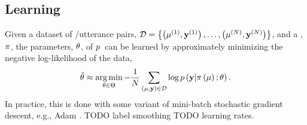 




\subsection{Learning}

Given a dataset of \meaningrepresentation/utterance pairs, $\mathcal{D} = \left\{\left(\mu^{(1)}, \mathbf{y}^{(1)}\right), \ldots, \left(\mu^{(N)},\mathbf{y}^{(N)} \right)\right\}$, 
and a 
\linearizationstrategy, $\pi$, the parameters, $\theta$, of $p$~can be learned by approximately
minimizing the negative log-likelihood of the data,
\[ \hat{\theta} \approx \operatorname*{arg\,min}_{\theta \in \Theta} -\frac{1}{N}\sum_{\left(\mu, \mathbf{y} \right) \in \mathcal{D}} 
    \log p\left(\mathbf{y}|\pi\left(\mu\right);\theta\right).
\]
In practice, this is done with some variant of mini-batch stochastic gradient descent, e.g., Adam
\cite{adam}.
TODO label smoothing
TODO learning rates.


